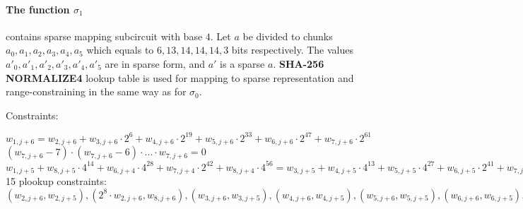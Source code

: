 \paragraph{The function $\sigma_1$} contains sparse mapping subcircuit with base $4$.
Let $a$ be divided to chunks $a_0, a_1, a_2, a_3, a_4, a_5$ which equals to $6, 13, 14, 14, 14, 3$ bits respectively.
The values $a'_0, a'_1, a'_2, a'_3, a'_4, a'_5$ are in sparse form, and $a'$ is a sparse $a$.
\textbf{SHA-256 NORMALIZE4} lookup table is used for mapping to sparse representation and range-constraining in the same way as for $\sigma_0$.

Constraints:
\begin{center}
    $w_{1, j + 6} = w_{2, j + 6} + w_{3, j + 6} \cdot 2^{6} + w_{4, j + 6} \cdot 2^{19} + w_{5, j + 6} \cdot 2^{33} + w_{6, j + 6} \cdot 2^{47} + w_{7,  j + 6}\cdot 2^{61}$ \\
    $(w_{7, j + 6} - 7) \cdot (w_{7, j + 6} - 6) \cdot ... \cdot w_{7, j + 6} = 0$ \\
    $w_{1, j + 5} + w_{8, j + 5} \cdot 4^{14} + w_{6, j + 4} \cdot 4^{28} + w_{7, j + 4} \cdot 2^{42} + w_{8, j + 4} \cdot 4^{56} = w_{3, j + 5} + w_{4, j + 5} \cdot 4^{13} + w_{5, j + 5} \cdot 4^{27} + w_{6, j + 5} \cdot 2^{41} + w_{7, j + 5} \cdot 4^{55} +
     w_{4, j + 5} + w_{5, j + 5} \cdot 4^{14} + w_{6, j + 5} \cdot 4^{28} + w_{7, j + 5} \cdot 2^{42} + w_{2, j + 5} \cdot 4^{45} + w_{3, j + 5} \cdot 4^{51} + 
     w_{7, j + 5} + w_{2, j + 5} \cdot 4^{3} + w_{3, j + 5} \cdot 4^{9} + w_{4, j + 5} \cdot 2^{22} + w_{5, j + 5} \cdot 4^{36} + w_{6, j + 5} \cdot 4^{50}$ \\
    15 plookup constraints: $(w_{2, j + 6}, w_{2, j + 5}), ( 2^{8} \cdot w_{2, j + 6}, w_{8, j + 6}), (w_{3, j + 6}, w_{3, j + 5}), (w_{4, j + 6}, w_{4, j + 5}), (w_{5, j + 6}, w_{5, j + 5}), (w_{6, j + 6}, w_{6, j + 5}),  (w_{7, j + 6}, w_{7, j + 5}),  (2 \cdot w_{7, j + 6}, w_{9, j + 6}), (w_{1, j + 4}, w_{1, j + 5}), (w_{2, j + 4}, w_{8, j + 5}), (w_{3, j + 4}, w_{6, j + 4}), (w_{4, j + 4}, w_{7, j + 4}), (w_{5, j + 4}, w_{8, j + 4}), (2^6 \cdot w_{5, j + 4}, w_{9, j + 4})$
\end{center}


